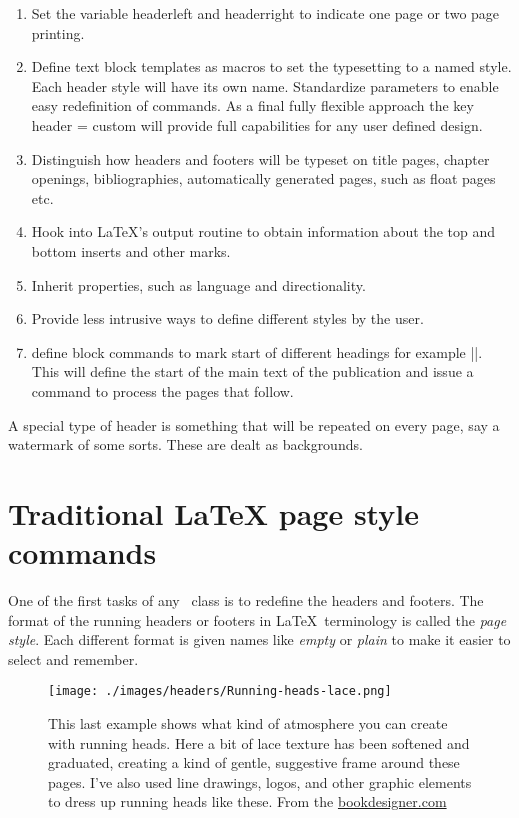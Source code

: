 \begin{enumerate}
\item Set the variable headerleft and headerright to indicate one page or two page printing.
\item Define text block templates as macros to set the typesetting to a named style. Each header style
         will have its own name. Standardize parameters to enable easy redefinition of commands. As a 
         final fully flexible approach the key header = custom will provide full capabilities for any user
         defined design.
\item Distinguish how headers and footers will be typeset on title pages, chapter openings, bibliographies, 
         automatically generated pages, such as float pages etc.
\item Hook into LaTeX’s output routine to obtain information about the top and bottom inserts and other marks.         
\item Inherit properties, such as language and directionality.
\item Provide less intrusive ways to define different styles by the user.
\item define block commands to mark start of different headings for example |\mainmatter|. This will define
         the start of the main text of the publication and issue a command to process the pages that follow.
\end{enumerate}

A special type of header is something that will be repeated on every page, say a watermark of some sorts. These are dealt as backgrounds.
 
\section{Traditional LaTeX page style commands}
  
One of the first tasks of any \LaTeXe\ class is to redefine the headers and footers. The format of the running headers or footers in \LaTeX\ terminology is called the \textit{page style}. Each different format is given names like \textit{empty} or \textit{plain} to make it easier to select and remember. 

\begin{figure}[hbt]
\texttt{[image: ./images/headers/Running-heads-lace.png]}
\caption{This last example shows what kind of atmosphere you can create with running heads. Here a bit of lace texture has been softened and graduated, creating a kind of gentle, suggestive frame around these pages. I’ve also used line drawings, logos, and other graphic elements to dress up running heads like these. From the \protect\href{bookk  }{bookdesigner.com}}
\end{figure}


